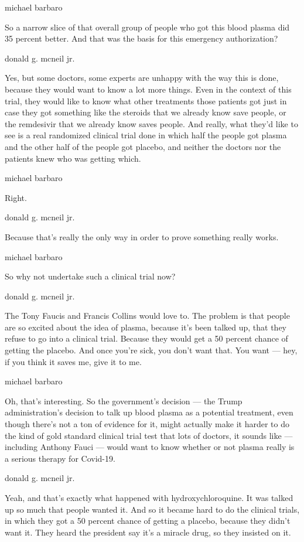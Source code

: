 michael barbaro

So a narrow slice of that overall group of people who got this blood
plasma did 35 percent better. And that was the basis for this emergency
authorization?

donald g. mcneil jr.

Yes, but some doctors, some experts are unhappy with the way this is
done, because they would want to know a lot more things. Even in the
context of this trial, they would like to know what other treatments
those patients got just in case they got something like the steroids
that we already know save people, or the remdesivir that we already know
saves people. And really, what they'd like to see is a real randomized
clinical trial done in which half the people got plasma and the other
half of the people got placebo, and neither the doctors nor the patients
knew who was getting which.

michael barbaro

Right.

donald g. mcneil jr.

Because that's really the only way in order to prove something really
works.

michael barbaro

So why not undertake such a clinical trial now?

donald g. mcneil jr.

The Tony Faucis and Francis Collins would love to. The problem is that
people are so excited about the idea of plasma, because it's been talked
up, that they refuse to go into a clinical trial. Because they would get
a 50 percent chance of getting the placebo. And once you're sick, you
don't want that. You want --- hey, if you think it saves me, give it to
me.

michael barbaro

Oh, that's interesting. So the government's decision --- the Trump
administration's decision to talk up blood plasma as a potential
treatment, even though there's not a ton of evidence for it, might
actually make it harder to do the kind of gold standard clinical trial
test that lots of doctors, it sounds like --- including Anthony Fauci
--- would want to know whether or not plasma really is a serious therapy
for Covid-19.

donald g. mcneil jr.

Yeah, and that's exactly what happened with hydroxychloroquine. It was
talked up so much that people wanted it. And so it became hard to do the
clinical trials, in which they got a 50 percent chance of getting a
placebo, because they didn't want it. They heard the president say it's
a miracle drug, so they insisted on it.

